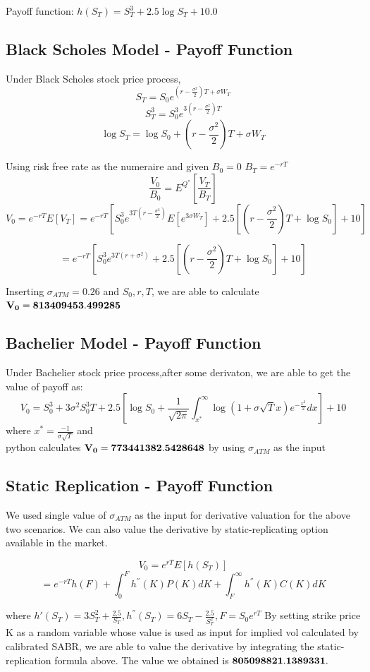 \documentclass[fleqn,12pt]{SelfArx}
\begin{document}
\noindent Payoff function: $h(S_T)=S_T^3+2.5\log{S_T}+10.0$

\subsection{Black Scholes Model - Payoff Function}
\noindent Under Black Scholes stock price process,
$$S_T=S_0 e^{(r-\frac{\sigma^2}{2})T+\sigma W_T}$$
$$S_T^3=S_0^3 e^{3(r-\frac{\sigma^2}{2})T}$$
$$\log{S_T}=\log{S_0}+(r-\frac{\sigma^2}{2}) T+\sigma W_T$$

\noindent Using risk free rate as the numeraire and given $B_0=0$ $B_T=e^{-rT}$
$$\frac{V_0}{B_0}=E^{Q^*}\left[\frac{V_T}{B_T}\right]$$
$$V_0=e^{-rT}E\left[V_T\right]=e^{-rT}\left[S_0^3 e^{3T(r-\frac{\sigma^2}{2})
}E\left[e^{3\sigma W_T}\right]+2.5\left[(r-\frac{\sigma^2}{2})T+\log{S_0}\right]+10\right]$$

$$=e^{-rT}\left[S_0^3 e^{3T(r+\sigma^2)}+2.5\left[(r-\frac{\sigma^2}{2})T+\log{S_0}\right]+10\right]$$

\noindent Inserting $\sigma_{ATM}=0.26$ and $S_0,r,T$, we are able to calculate $\bf{V_0=813409453.499285}$

\subsection{Bachelier Model - Payoff Function}
\noindent Under Bachelier stock price process,after some derivaton, we are able to get the value of payoff as:
$$V_0=S_0^3+3\sigma^2 S_0^3T+2.5\left[
\log{S_0}+\frac{1}{\sqrt{2\pi}}\int_{x^*}^{\infty}\log(1+\sigma \sqrt{T}x)e^{-\frac{x^2}{2}}dx\right]+10$$
\noindent where $x^*=\frac{-1}{\sigma \sqrt{T}}$ and \\
\noindent python calculates $\bf{V_0=773441382.5428648}$ by using $\sigma_{ATM}$ as the input\\

\subsection{Static Replication - Payoff Function}
\noindent We used single value of $\sigma_{ATM}$ as the input for derivative valuation for the above two scenarios. We can also value the derivative by static-replicating option available in the market.


$$V_0=e^{rT}E\left[h(S_T)\right] $$
$$=e^{-rT}h(F)+\int_{0}^{F}h^{''}(K)P(K)dK+\int_{F}^{\infty}h^{''}(K)C(K)dK$$

\noindent where $h'(S_T)=3S_T^2+\frac{2.5}{S_T}, h^{''}(S_T)=6S_T-\frac{2.5}{S_T^2}, F=S_0e^{rT}$
By setting strike price K as a random variable whose value is used as input for implied vol calculated by calibrated SABR, we are able to value the derivative by integrating the static-replication formula above. The value we obtained is $\bf{805098821.1389331.}$\\
\end{document}
